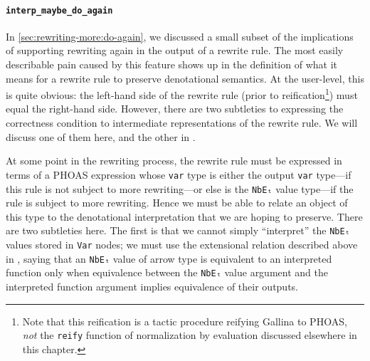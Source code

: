 \paragraph{\texorpdfstring{\texttt{interp_maybe_do_again}}{interp\_maybe\_do\_again}}
In \autoref{sec:rewriting-more:do-again}, we discussed a small subset of the implications of supporting rewriting again in the output of a rewrite rule.
The most easily describable pain caused by this feature shows up in the definition of what it means for a rewrite rule to preserve denotational semantics.
At the user-level, this is quite obvious: the left-hand side of the rewrite rule (prior to reification\footnote{%
  Note that this reification is a tactic procedure reifying Gallina to PHOAS, \emph{not} the \texttt{reify} function of normalization by evaluation discussed elsewhere in this chapter.%
}) must equal the right-hand side.
However, there are two subtleties to expressing the correctness condition to intermediate representations of the rewrite rule.
We will discuss one of them here, and the other in .

At some point in the rewriting process, the rewrite rule must be expressed in terms of a PHOAS expression whose \texttt{var} type is either the output \texttt{var} type---if this rule is not subject to more rewriting---or else is the \texttt{NbEₜ} value type---if the rule is subject to more rewriting.
Hence we must be able to relate an object of this type to the denotational interpretation that we are hoping to preserve.
There are two subtleties here.
The first is that we cannot simply ``interpret'' the \texttt{NbEₜ} values stored in \texttt{Var} nodes; we must use the extensional relation described above in , saying that an \texttt{NbEₜ} value of arrow type is equivalent to an interpreted function only when equivalence between the \texttt{NbEₜ} value argument and the interpreted function argument implies equivalence of their outputs.


